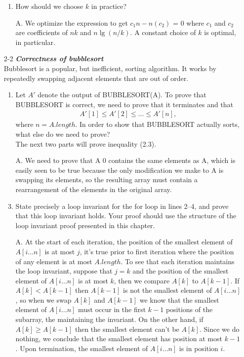 \documentclass[fontsize=12pt,paper=a4]{book}
\begin{document}
\begin{enumerate}
\begin{enumerate}
        \item How should we choose $k$ in practice?
        \item[A.]
              We optimize the expression to get $c_1n - n(c_2)$ = 0 where $c_1$ and $c_2$ are coefficients of $nk$ and $n \lg(n/k)$. A constant choice of $k$ is optimal, in particular.
       \end{enumerate}
       
 \item[2-2]
       \textbf{\textit{Correctness of bubblesort}}\\
       Bubblesort is a popular, but inefficient, sorting algorithm. It works by repeatedly swapping adjacent elements that are out of order.
       
       \begin{enumerate}
        \item Let $A'$ denote the output of BUBBLESORT(A). To prove that BUBBLESORT is correct, we need to prove that it terminates and that
              \begin{align}
               A'[1] \leq A'[2] \leq \dots \leq A'[n],		\label{2.3}
              \end{align}
              where $n=A.length$. In order to show that BUBBLESORT actually sorts, what else do we need to prove?\\
              The next two parts will prove inequality (2.3).
        \item[A.]
              We need to prove that A 0 contains the same elements as A, which is easily seen to be true because the only modification we make to A is swapping its elements, so the resulting array must contain a rearrangement of the elements in the original array.
              
        \item State precisely a loop invariant for the for loop in lines 2–4, and prove that this loop invariant holds. Your proof should use the structure of the loop invariant proof presented in this chapter.
        \item[A.]
              At the start of each iteration, the position of the smallest element of $A[i \dots n]$ is at most $j$, it’s true prior to first iteration where the position of any element is at most $A.length$. To see that each iteration maintains the loop invariant, suppose that $j = k$ and the position of the smallest element of $A[i \dots n]$ is at most $k$, then we compare $A[k]$ to $A[k-1]$. If $A[k] < A[k-1]$ then $A[k-1]$ is not the smallest element of $A[i \dots n]$, so when we swap $A[k]$ and $A[k-1]$ we know that the smallest element of $A[i \dots n]$ must occur in the first $k-1$ positions of the subarray, the maintaining the invariant. On the other hand, if $A[k] \geq A[k-1]$ then the smallest element can’t be $A[k]$. Since we do nothing, we conclude that the smallest element has position at most $k-1$. Upon termination, the smallest element of $A[i \dots n]$ is in position $i$.
              

\end{enumerate}
\end{enumerate}
\end{document}
